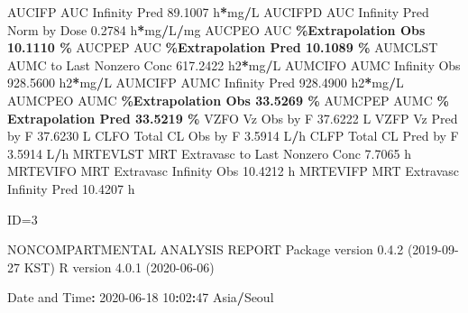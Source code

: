 \documentclass[
  10pt,
]{krantz}
\makeatletter
\newenvironment{Shaded}{\begin{snugshade}}{\end{snugshade}}
\newcommand{\DecValTok}[1]{\textcolor[rgb]{0.00,0.00,0.81}{#1}}
\newcommand{\FloatTok}[1]{\textcolor[rgb]{0.00,0.00,0.81}{#1}}
\newcommand{\NormalTok}[1]{#1}
\newcommand{\OperatorTok}[1]{\textcolor[rgb]{0.81,0.36,0.00}{\textbf{#1}}}
\newcommand{\StringTok}[1]{\textcolor[rgb]{0.31,0.60,0.02}{#1}}
\newenvironment{kframe}{%
\medskip{}
\setlength{\fboxsep}{.8em}
 \def\at@end@of@kframe{}%
 \ifinner\ifhmode%
  \def\at@end@of@kframe{\end{minipage}}%
  \begin{minipage}{\columnwidth}%
 \fi\fi%
 \def\FrameCommand##1{\hskip\@totalleftmargin \hskip-\fboxsep
 \colorbox{shadecolor}{##1}\hskip-\fboxsep
     \hskip-\linewidth \hskip-\@totalleftmargin \hskip\columnwidth}%
 \MakeFramed {\advance\hsize-\width
   \@totalleftmargin\z@ \linewidth\hsize
   \@setminipage}}%
 {\par\unskip\endMakeFramed%
 \at@end@of@kframe}
\renewenvironment{Shaded}{\begin{kframe}}{\end{kframe}}
\makeatother
\begin{document}
\begin{Shaded}
\begin{Highlighting}[]
\NormalTok{AUCIFP     AUC Infinity Pred                              }\FloatTok{89.1007}\NormalTok{ h}\OperatorTok{*}\NormalTok{mg}\OperatorTok{/}\NormalTok{L}
\NormalTok{AUCIFPD    AUC Infinity Pred Norm by Dose                  }\FloatTok{0.2784}\NormalTok{ h}\OperatorTok{*}\NormalTok{mg}\OperatorTok{/}\NormalTok{L}\OperatorTok{/}\NormalTok{mg}
\NormalTok{AUCPEO     AUC }\OperatorTok{\%Extrapolation Obs                         10.1110 \%}
\NormalTok{AUCPEP     AUC }\OperatorTok{\%Extrapolation Pred                        10.1089 \%}
\NormalTok{AUMCLST    AUMC to Last Nonzero Conc                     }\FloatTok{617.2422}\NormalTok{ h2}\OperatorTok{*}\NormalTok{mg}\OperatorTok{/}\NormalTok{L}
\NormalTok{AUMCIFO    AUMC Infinity Obs                             }\FloatTok{928.5600}\NormalTok{ h2}\OperatorTok{*}\NormalTok{mg}\OperatorTok{/}\NormalTok{L}
\NormalTok{AUMCIFP    AUMC Infinity Pred                            }\FloatTok{928.4900}\NormalTok{ h2}\OperatorTok{*}\NormalTok{mg}\OperatorTok{/}\NormalTok{L}
\NormalTok{AUMCPEO    AUMC }\OperatorTok{\%Extrapolation Obs                        33.5269 \%}
\NormalTok{AUMCPEP    AUMC }\OperatorTok{\% Extrapolation Pred                      33.5219 \%}
\NormalTok{VZFO       Vz Obs by F                                    }\FloatTok{37.6222}\NormalTok{ L}
\NormalTok{VZFP       Vz Pred by F                                   }\FloatTok{37.6230}\NormalTok{ L}
\NormalTok{CLFO       Total CL Obs by F                               }\FloatTok{3.5914}\NormalTok{ L}\OperatorTok{/}\NormalTok{h}
\NormalTok{CLFP       Total CL Pred by F                              }\FloatTok{3.5914}\NormalTok{ L}\OperatorTok{/}\NormalTok{h}
\NormalTok{MRTEVLST   MRT Extravasc to Last Nonzero Conc              }\FloatTok{7.7065}\NormalTok{ h}
\NormalTok{MRTEVIFO   MRT Extravasc Infinity Obs                     }\FloatTok{10.4212}\NormalTok{ h}
\NormalTok{MRTEVIFP   MRT Extravasc Infinity Pred                    }\FloatTok{10.4207}\NormalTok{ h}





\NormalTok{ID=}\DecValTok{3}

\NormalTok{                        NONCOMPARTMENTAL ANALYSIS REPORT}
\NormalTok{                       Package version }\DecValTok{0}\NormalTok{.}\FloatTok{4.2}\NormalTok{ (}\DecValTok{2019{-}09{-}27}\NormalTok{ KST)}
\NormalTok{                          R version }\DecValTok{4}\NormalTok{.}\FloatTok{0.1}\NormalTok{ (}\DecValTok{2020{-}06{-}06}\NormalTok{)}

\NormalTok{Date and Time}\OperatorTok{:}\StringTok{ }\DecValTok{2020{-}06{-}18} \DecValTok{10}\OperatorTok{:}\DecValTok{02}\OperatorTok{:}\DecValTok{47}\NormalTok{ Asia}\OperatorTok{/}\NormalTok{Seoul}


\end{Highlighting}
\end{Shaded}
\end{document}
